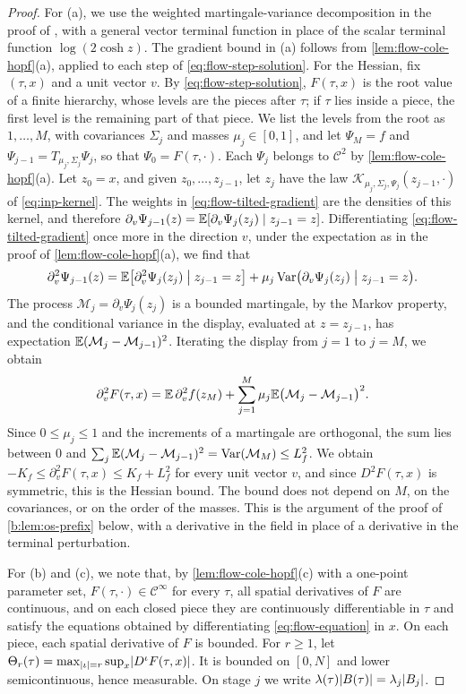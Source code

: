 \begin{proof}
For (a), we use the weighted martingale-variance decomposition in the proof of
\cite[Lemma~3.1]{oai-barriers}, with a general vector terminal function in place
of the scalar terminal function $\log(2\cosh z)$.
The gradient bound in (a) follows from \cref{lem:flow-cole-hopf}(a), applied to
each step of \eqref{eq:flow-step-solution}. For the Hessian, fix $(\tau,x)$ and a
unit vector $v$. By \eqref{eq:flow-step-solution}, $F(\tau,x)$ is the root value
of a finite hierarchy, whose levels are the pieces after $\tau$; if $\tau$ lies
inside a piece, the first level is the remaining part of that piece. We list the
levels from the root as $1,\dots,M$, with covariances $\Sigma_j$ and masses
$\mu_j\in[0,1]$, and let $\Psi_M=f$ and $\Psi_{j-1}=T_{\mu_j,\Sigma_j}\Psi_j$, so
that $\Psi_0=F(\tau,\cdot)$. Each $\Psi_j$ belongs to $\mathcal C^2$ by
\cref{lem:flow-cole-hopf}(a). Let $z_0=x$, and given $z_0,\dots,z_{j-1}$, let $z_j$
have the law $\mathcal K_{\mu_j,\Sigma_j,\Psi_j}(z_{j-1},\cdot)$ of
\eqref{eq:inp-kernel}. The weights in \eqref{eq:flow-tilted-gradient} are the
densities of this kernel, and therefore
$\partial_v\Psi_{j-1}(z)=\mathbb E[\partial_v\Psi_j(z_j)\mid z_{j-1}=z]$.
Differentiating \eqref{eq:flow-tilted-gradient} once more in the direction $v$,
under the expectation as in the proof of \cref{lem:flow-cole-hopf}(a), we find
that
\[
 \partial_v^2\Psi_{j-1}(z)=\mathbb E\bigl[\partial_v^2\Psi_j(z_j)\bigm|z_{j-1}=z\bigr]
 +\mu_j\operatorname{Var}\bigl(\partial_v\Psi_j(z_j)\bigm|z_{j-1}=z\bigr).
\]
The process $\mathcal M_j=\partial_v\Psi_j(z_j)$ is a bounded martingale, by the
Markov property, and the conditional variance in the display, evaluated at
$z=z_{j-1}$, has expectation $\mathbb E(\mathcal M_j-\mathcal M_{j-1})^2$. Iterating the
display from $j=1$ to $j=M$, we obtain
\[
 \partial_v^2F(\tau,x)=\mathbb E\,\partial_v^2f(z_M)
 +\sum_{j=1}^M\mu_j\mathbb E\bigl(\mathcal M_j-\mathcal M_{j-1}\bigr)^2.
\]
Since $0\le\mu_j\le1$ and the increments of a martingale are orthogonal, the sum
lies between $0$ and $\sum_j\mathbb E(\mathcal M_j-\mathcal M_{j-1})^2=\operatorname{Var}(\mathcal M_M)\le
L_f^2$. We obtain $-K_f\le\partial_v^2F(\tau,x)\le K_f+L_f^2$ for every unit vector
$v$, and since $D^2F(\tau,x)$ is symmetric, this is the Hessian bound. The bound
does not depend on $M$, on the covariances, or on the order of the masses. This
is the argument of the proof of \cref{b:lem:os-prefix} below, with a derivative
in the field in place of a derivative in the terminal perturbation.

For (b) and (c), we note that, by \cref{lem:flow-cole-hopf}(c) with a one-point
parameter set, $F(\tau,\cdot)\in\mathcal C^\infty$ for every $\tau$, all spatial
derivatives of $F$ are continuous, and on each closed piece they are continuously
differentiable in $\tau$ and satisfy the equations obtained by differentiating
\eqref{eq:flow-equation} in $x$. On each piece, each spatial derivative of
$F$ is bounded. For $r\ge1$, let
$\Theta_r(\tau)=\max_{\lvert \iota\rvert=r}\sup_x\lvert D^\iota F(\tau,x)\rvert$. It is bounded on
$[0,N]$ and lower semicontinuous, hence measurable. On stage $j$ we write
$\lambda(\tau)\lvert B(\tau)\rvert=\lambda_j\lvert B_j\rvert$.


\end{proof}
